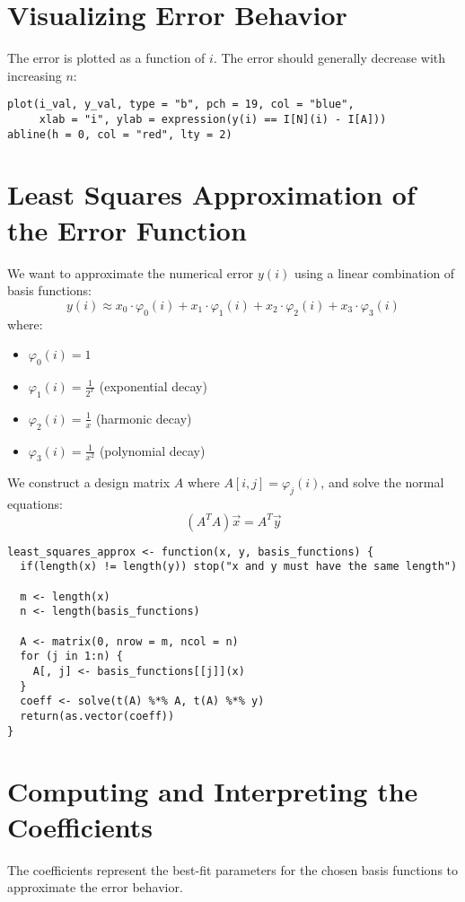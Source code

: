 \documentclass[a4paper,12pt]{article}
\begin{document}
\section{Visualizing Error Behavior}
The error is plotted as a function of $i$. The error should generally decrease with increasing $n$:

\begin{lstlisting}[caption=Plot the numerical error]
plot(i_val, y_val, type = "b", pch = 19, col = "blue",
     xlab = "i", ylab = expression(y(i) == I[N](i) - I[A]))
abline(h = 0, col = "red", lty = 2)
\end{lstlisting}
\newpage
\section{Least Squares Approximation of the Error Function}
We want to approximate the numerical error $y(i)$ using a linear combination of basis functions:
\[ y(i) \approx x_0 \cdot \varphi_0(i) + x_1 \cdot \varphi_1(i) + x_2 \cdot \varphi_2(i) + x_3 \cdot \varphi_3(i) \]
where:
\begin{itemize}
  \item $\varphi_0(i) = 1$
  \item $\varphi_1(i) = \frac{1}{2^x}$ (exponential decay)
  \item $\varphi_2(i) = \frac{1}{x}$ (harmonic decay)
  \item $\varphi_3(i) = \frac{1}{x^2}$ (polynomial decay)
\end{itemize}

We construct a design matrix $A$ where $A[i,j] = \varphi_j(i)$, and solve the normal equations:
\[ (A^T A)\vec{x} = A^T \vec{y} \]

\begin{lstlisting}[caption=Least squares approximation function]
least_squares_approx <- function(x, y, basis_functions) {
  if(length(x) != length(y)) stop("x and y must have the same length")

  m <- length(x)
  n <- length(basis_functions)

  A <- matrix(0, nrow = m, ncol = n)
  for (j in 1:n) {
    A[, j] <- basis_functions[[j]](x)
  }
  coeff <- solve(t(A) %*% A, t(A) %*% y)
  return(as.vector(coeff))
}
\end{lstlisting}

\section{Computing and Interpreting the Coefficients}
The coefficients represent the best-fit parameters for the chosen basis functions to approximate the error behavior.
\end{document}
